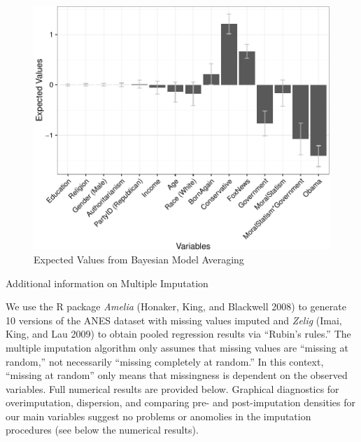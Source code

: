 \documentclass[12pt,]{article}
\begin{document}
\begin{figure}[htbp]
\centering
\includegraphics{figures/bma3-1.pdf}
\caption{Expected Values from Bayesian Model Averaging}
\end{figure}

\clearpage

Additional information on Multiple Imputation

We use the R package \emph{Amelia} (Honaker, King, and Blackwell 2008) to generate 10
versions of the ANES dataset with missing values imputed and
\emph{Zelig} (Imai, King, and Lau 2009) to obtain pooled regression results via ``Rubin's rules.'' The multiple
imputation algorithm only assumes that missing values are ``missing at
random,'' not necessarily ``missing completely at random.'' In this
context, ``missing at random'' only means that missingness is dependent
on the observed variables. Full numerical results are provided below. Graphical diagnostics for overimputation,
dispersion, and comparing pre- and post-imputation densities for our
main variables suggest no problems or anomolies in the imputation
procedures (see below the numerical results).
\end{document}
